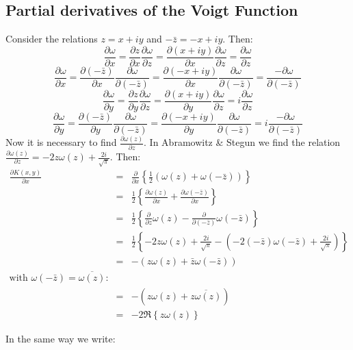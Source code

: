 \documentclass[10pt,a4paper]{report}
\begin{document}
\begin{flushleft}
\section{Partial derivatives of the Voigt Function}
Consider the relations $z=x+iy$ and $-\bar{z}=-x+iy$. Then:
\[\frac{\partial\omega}{\partial x}=\frac{\partial z}{\partial x}\frac{\partial\omega}{\partial z}=\frac{\partial(x+iy)}{\partial x}\frac{\partial\omega}{\partial z}=\frac{\partial\omega}{\partial z}\]
\[\frac{\partial\omega}{\partial x}=\frac{\partial(-\bar{z})}{\partial x}\frac{\partial\omega}{\partial(-\bar{z})}=\frac{\partial(-x+iy)}{\partial x}\frac{\partial\omega}{\partial(-\bar{z})}=\frac{-\partial\omega}{\partial(-\bar{z})}\]
\[\frac{\partial\omega}{\partial y}=\frac{\partial z}{\partial y}\frac{\partial\omega}{\partial z}=\frac{\partial(x+iy)}{\partial y}\frac{\partial\omega}{\partial z}=i\frac{\partial\omega}{\partial z}\]
\[\frac{\partial\omega}{\partial y}=\frac{\partial(-\bar{z})}{\partial y}\frac{\partial\omega}{\partial(-\bar{z})}=\frac{\partial(-x+iy)}{\partial y}\frac{\partial\omega}{\partial(-\bar{z})}=i\frac{-\partial\omega}{\partial(-\bar{z})}\]
Now it is necessary to find $\frac{\partial\omega(z)}{\partial z}$. In Abramowitz \& Stegun we find the relation $\frac{\partial\omega(z)}{\partial z}=-2z\omega(z)+\frac{2i}{\sqrt{\pi}}$. Then:
\begin{eqnarray*}
\frac{\partial K(x,y)}{\partial x}&=&\frac{\partial}{\partial x}\left\{ \frac{1}{2} \left( \omega(z)+\omega(-\bar{z})\right)\right\}\\
&=&\frac{1}{2}\left\{\frac{\partial\omega(z)}{\partial x}+\frac{\partial\omega(-\bar{z})}{\partial x}\right\}\\
&=&\frac{1}{2}\left\{\frac{\partial}{\partial z}\omega(z)-\frac{\partial}{\partial(-\bar{z})}\omega(-\bar{z})\right\}\\
&=&\frac{1}{2}\left\{-2z\omega(z)+\frac{2i}{\sqrt{\pi}}-\left(-2(-\bar{z})\omega(-\bar{z})+\frac{2i}{\sqrt{\pi}}\right)\right\}\\
&=&-\left(z\omega(z)+\bar{z}\omega(-\bar{z})\right)\\
\mbox{with }\omega(-\bar{z})=\overline{\omega(z)}\mbox{:}&&\\
&=&-\left(z\omega(z)+\overline{z\omega(z)}\right)\\
&=&-2\Re\left\{z\omega(z)\right\} 
\end{eqnarray*}



In the same way we write:


\end{flushleft}
\end{document}
